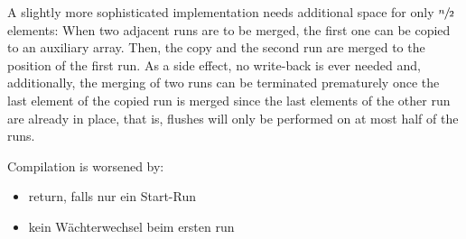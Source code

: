 A slightly more sophisticated implementation needs additional space for only \(\sfrac{n}{2}\) elements:
When two adjacent runs are to be merged, the first one can be copied to an auxiliary array.
Then, the copy and the second run are merged to the position of the first run.
As a side effect, no write-back is ever needed and, additionally, the merging of two runs can be terminated prematurely once the last element of the copied run is merged since the last elements of the other run are already in place, that is, flushes will only be performed on at most half of the runs.

Compilation is worsened by:
\begin{itemize}
	\item
	return, falls nur ein Start-Run

	\item
	kein Wächterwechsel beim ersten run
\end{itemize}
